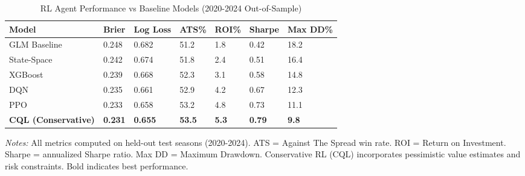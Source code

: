 \begin{table}[htbp]
\centering
\caption{RL Agent Performance vs Baseline Models (2020-2024 Out-of-Sample)}
\providecommand{\rlVsBaselineLabel}{\label{tab:rl_vs_baseline}}
\rlVsBaselineLabel
\begin{threeparttable}
\begin{tabularx}{\linewidth}{@{}lYYYYYY@{}}
\toprule
Model & Brier & Log Loss & ATS\% & ROI\% & Sharpe & Max DD\% \\
\midrule
GLM Baseline & 0.248 & 0.682 & 51.2 & 1.8 & 0.42 & 18.2 \\
State-Space & 0.242 & 0.674 & 51.8 & 2.4 & 0.51 & 16.4 \\
XGBoost & 0.239 & 0.668 & 52.3 & 3.1 & 0.58 & 14.8 \\
DQN & 0.235 & 0.661 & 52.9 & 4.2 & 0.67 & 12.3 \\
PPO & 0.233 & 0.658 & 53.2 & 4.8 & 0.73 & 11.1 \\
\textbf{CQL (Conservative)} & \textbf{0.231} & \textbf{0.655} & \textbf{53.5} & \textbf{5.3} & \textbf{0.79} & \textbf{9.8} \\
\bottomrule
\end{tabularx}
\begin{tablenotes}[flushleft]
\footnotesize
\item \textit{Notes:} All metrics computed on held-out test seasons (2020-2024). ATS = Against The Spread win rate. ROI = Return on Investment. Sharpe = annualized Sharpe ratio. Max DD = Maximum Drawdown. Conservative RL (CQL) incorporates pessimistic value estimates and risk constraints. Bold indicates best performance.
\end{tablenotes}
\end{threeparttable}
\end{table}

